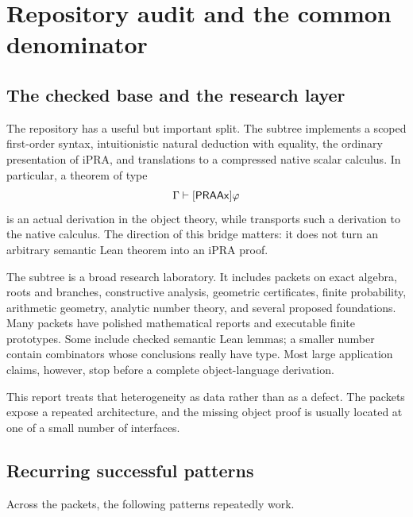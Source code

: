 \section{Repository audit and the common denominator}
\label{sec:audit}

\subsection{The checked base and the research layer}

The repository has a useful but important split.  The 
subtree implements a scoped first-order syntax, intuitionistic natural
deduction with equality, the ordinary presentation of iPRA, and translations
to a compressed native scalar calculus.  In particular, a theorem of type
\[
  \Gamma\vdash[\mathsf{PRAAx}]\varphi
\]
is an actual derivation in the object theory, while
 transports such a derivation to the native calculus.
The direction of this bridge matters: it does not turn an arbitrary semantic
Lean theorem into an iPRA proof.

The  subtree is a broad research laboratory.  It includes
packets on exact algebra, roots and branches, constructive analysis, geometric
certificates, finite probability, arithmetic geometry, analytic number theory,
and several proposed foundations.  Many packets have polished mathematical
reports and executable finite prototypes.  Some include checked semantic Lean
lemmas; a smaller number contain combinators whose conclusions really have
 type.  Most large application claims, however, stop before a
complete object-language derivation.

This report treats that heterogeneity as data rather than as a defect.  The
packets expose a repeated architecture, and the missing object proof is usually
located at one of a small number of interfaces.

\subsection{Recurring successful patterns}

Across the packets, the following patterns repeatedly work.

